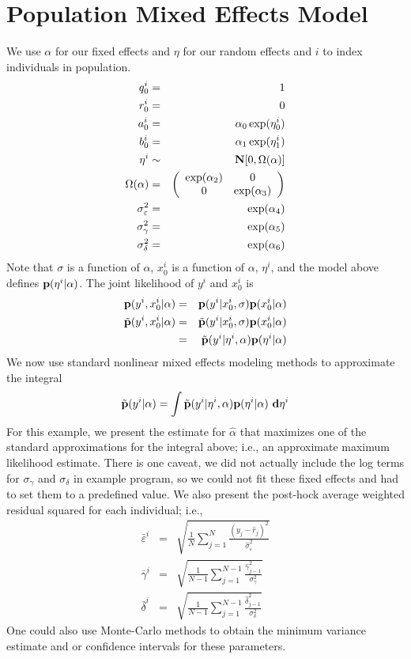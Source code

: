 \documentclass{article}
\newcommand{\BN}{{\bf N}}
\newcommand{\Bd}{{\bf d}}
\newcommand{\Bp}{{\bf p}}
\begin{document}
\section{Population Mixed Effects Model}
We use \( \alpha \) for our fixed effects and \( \eta \)
for our random effects and \( i \) to index individuals in population.
\begin{eqnarray*}
q^i_0 & = & 1
\\
r^i_0 & = & 0
\\
a^i_0 & = & \alpha_0 \exp ( \eta^i_0 )
\\
b^i_0 & = & \alpha_1 \exp ( \eta^i_1 )
\\
\eta^i & \sim&  \BN [ 0 , \Omega ( \alpha ) ]
\\
\Omega ( \alpha ) & = & \left( \begin{array}{cc}
	\exp( \alpha_2 ) & 0 \\
	0                & \exp( \alpha_3 )
\end{array} \right)
\\
\sigma_\varepsilon^2 & = & \exp( \alpha_4 )
\\
\sigma_\gamma^2      & = & \exp( \alpha_5 )
\\
\sigma_\delta^2      & = & \exp( \alpha_6 )
\end{eqnarray*}
Note that \( \sigma \) is a function of \( \alpha \),
\( x^i_0 \) is a function of \( \alpha \),  \( \eta^i \),
and the model above defines
\( \Bp ( \eta^i | \alpha ) \).
The joint likelihood of \( y^i \) and \( x^i_0 \) is
\begin{eqnarray*}
\Bp ( y^i , x^i_0 | \alpha )
& = &
\Bp ( y^i | x^i_0 , \sigma ) \Bp ( x^i_0 | \alpha )
\\
\tilde{ \Bp } ( y^i , x^i_0 | \alpha )
& = &
\tilde{ \Bp } ( y^i | x^i_0 , \sigma ) \Bp ( x^i_0 | \alpha )
\\
& = & 
\tilde{ \Bp } ( y^i | \eta^i , \alpha ) \Bp ( \eta^i | \alpha )
\end{eqnarray*}
We now use standard nonlinear mixed effects modeling methods to
approximate the integral
\[
\tilde{ \Bp } ( y^i | \alpha )
=
\int 
\tilde{ \Bp } ( y^i | \eta^i , \alpha ) \Bp ( \eta^i | \alpha ) ~ \Bd \eta^i
\]
For this example,
we present the estimate for \( \hat{\alpha} \) that maximizes
one of the standard approximations for the integral above; i.e.,
an approximate maximum likelihood estimate.
There is one caveat, 
we did not actually include
the log terms for \( \sigma_\gamma \) and \( \sigma_\delta \) in
example program, so we could not fit these fixed effects and had
to set them to a predefined value.
We also present the post-hock average weighted residual squared
for each individual; i.e.,
\begin{eqnarray*}
\bar{\varepsilon}^i & = & 
\sqrt{
\frac{1}{N} \sum_{j=1}^N 
\frac{ (y_j - \hat{r}_j )^2 }{ \hat{\sigma}_\varepsilon^2 } 
}
\\
\bar{\gamma}^i & = & 
\sqrt{
\frac{1}{N-1} \sum_{j=1}^{N-1} 
\frac{ \hat{\gamma}_{j-1}^2 }{ \sigma_\gamma^2 } 
}
\\
\bar{\delta}^i & = & 
\sqrt{
\frac{1}{N-1} \sum_{j=1}^{N-1} 
\frac{ \hat{\delta}_{j-1}^2 }{ \sigma_\delta^2 } 
}
\end{eqnarray*}
One could also use Monte-Carlo methods to obtain the minimum variance
estimate and or confidence intervals for these parameters.
\end{document}
